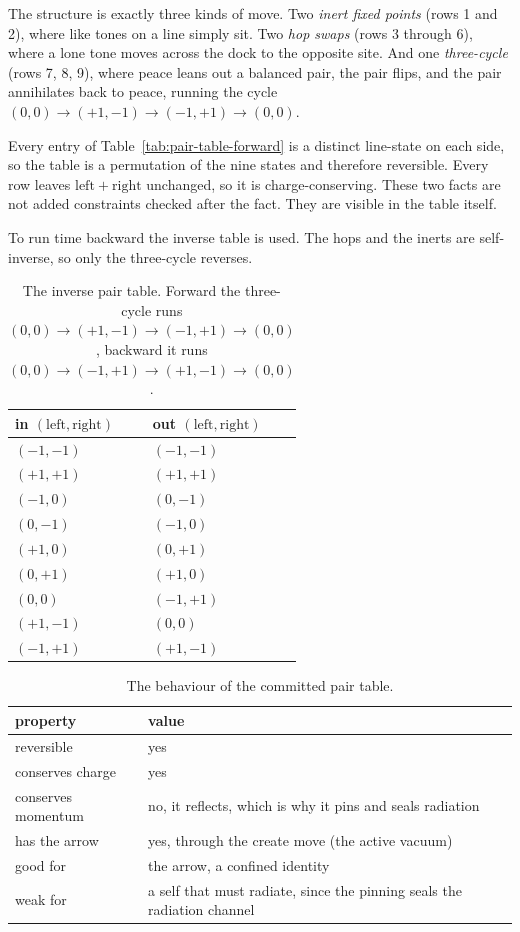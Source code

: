 The structure is exactly three kinds of move. Two \emph{inert fixed points} (rows 1 and 2), where like tones on a line simply sit. Two \emph{hop swaps} (rows 3 through 6), where a lone tone moves across the dock to the opposite site. And one \emph{three-cycle} (rows 7, 8, 9), where peace leans out a balanced pair, the pair flips, and the pair annihilates back to peace, running the cycle $(0,0) \to (+1,-1) \to (-1,+1) \to (0,0)$.

Every entry of Table~\ref{tab:pair-table-forward} is a distinct line-state on each side, so the table is a permutation of the nine states and therefore reversible. Every row leaves $\mathrm{left} + \mathrm{right}$ unchanged, so it is charge-conserving. These two facts are not added constraints checked after the fact. They are visible in the table itself.

To run time backward the inverse table is used. The hops and the inerts are self-inverse, so only the three-cycle reverses.

\begin{table}[ht]
\centering
\begin{tabular}{@{}ll@{}}
\toprule
in $(\mathrm{left}, \mathrm{right})$ & out $(\mathrm{left}, \mathrm{right})$ \\
\midrule
$(-1, -1)$ & $(-1, -1)$ \\
$(+1, +1)$ & $(+1, +1)$ \\
$(-1, 0)$ & $(0, -1)$ \\
$(0, -1)$ & $(-1, 0)$ \\
$(+1, 0)$ & $(0, +1)$ \\
$(0, +1)$ & $(+1, 0)$ \\
$(0, 0)$ & $(-1, +1)$ \\
$(+1, -1)$ & $(0, 0)$ \\
$(-1, +1)$ & $(+1, -1)$ \\
\bottomrule
\end{tabular}
\caption{The inverse pair table. Forward the three-cycle runs $(0,0) \to (+1,-1) \to (-1,+1) \to (0,0)$, backward it runs $(0,0) \to (-1,+1) \to (+1,-1) \to (0,0)$.}
\label{tab:pair-table-inverse}
\end{table}

\begin{table}[ht]
\centering
\begin{tabular}{@{}ll@{}}
\toprule
property & value \\
\midrule
reversible & yes \\
conserves charge & yes \\
conserves momentum & no, it reflects, which is why it pins and seals radiation \\
has the arrow & yes, through the create move (the active vacuum) \\
good for & the arrow, a confined identity \\
weak for & a self that must radiate, since the pinning seals the radiation channel \\
\bottomrule
\end{tabular}
\caption{The behaviour of the committed pair table.}
\label{tab:pair-table-behaviour}
\end{table}

